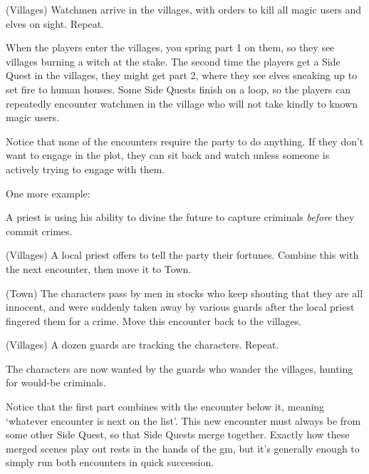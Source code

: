 \begin{multicols}{2}
\begin{list}{\Square}{}
\item{(Villages) Watchmen arrive in the villages, with orders to kill all magic users and elves on sight. Repeat.}

\end{list}

When the players enter the villages, you spring part 1 on them, so they see villages burning a witch at the stake.
The second time the players get a Side Quest in the villages, they might get part 2, where they see elves sneaking up to set fire to human houses.
Some Side Quests finish on a loop, so the players can repeatedly encounter watchmen in the village who will not take kindly to known magic users.

Notice that none of the encounters require the party to do anything.
If they don't want to engage in the plot, they can sit back and watch unless someone is actively trying to engage with them.

One more example:

\begin{exampletext}

A priest is using his ability to divine the future to capture criminals \emph{before} they commit crimes.

\end{exampletext}

\begin{list}{\Square}{}

\item[\CheckedBox]{(Villages) A local priest offers to tell the party their fortunes.  Combine this with the next encounter, then move it to Town.}

\item{(Town) The characters pass by men in stocks who keep shouting that they are all innocent, and were suddenly taken away by various guards after the local priest fingered them for a crime.  Move this encounter back to the villages.}

\item{(Villages) A dozen guards are tracking the characters. Repeat.}

\end{list}

The characters are now wanted by the guards who wander the villages, hunting for would-be criminals.

Notice that the first part combines with the encounter below it, meaning `whatever encounter is next on the list'.
This new encounter must always be from some other Side Quest, so that Side Quests merge together.
Exactly how these merged scenes play out rests in the hands of the \gls{gm}, but it's generally enough to simply run both encounters in quick succession.


\end{multicols}
